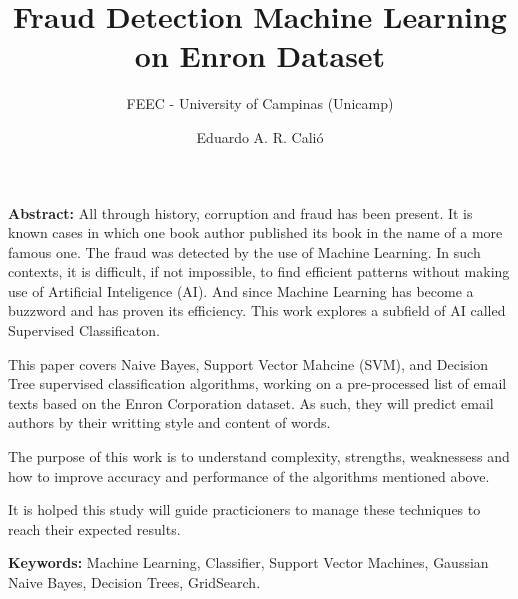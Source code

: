 \documentclass[11pt]{article}
\title{Fraud Detection Machine Learning on Enron Dataset}
\author{Eduardo A. R. Calió}
\subtitle{FEEC - University of Campinas (Unicamp)}
\begin{document}
    
    
    \maketitle

\begin{footnotesize}
\textbf{Abstract:} All through history, corruption and fraud has been present. It is known
cases in which one book author published its book in the name of a more
famous one. The fraud was detected by the use of Machine Learning. In
such contexts, it is difficult, if not impossible, to find efficient
patterns without making use of Artificial Inteligence (AI). And since
Machine Learning has become a buzzword and has proven its efficiency.
This work explores a subfield of AI called Supervised Classificaton.

This paper covers Naive Bayes, Support Vector Mahcine (SVM), and
Decision Tree supervised classification algorithms, working on a
pre-processed list of email texts based on the Enron Corporation
dataset. As such, they will predict email authors by their writting
style and content of words.

The purpose of this work is to understand complexity, strengths,
weaknessess and how to improve accuracy and performance of the
algorithms mentioned above.

It is holped this study will guide practicioners to manage these
techniques to reach their expected results.

\textbf{Keywords:} Machine Learning, Classifier, Support Vector
Machines, Gaussian Naive Bayes, Decision Trees, GridSearch.
\end{footnotesize}
\end{document}
